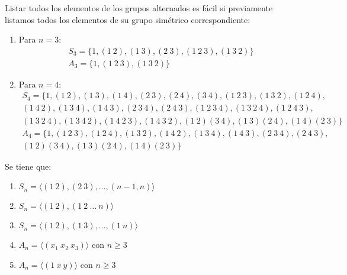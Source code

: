 \begin{ejemplo}
    Listar todos los elementos de los grupos alternados es fácil si previamente listamos todos los elementos de su grupo simétrico correspondiente:
    \begin{enumerate}
        \item Para $n=3$:
        \begin{gather*}
            S_3 = \{1, (1\ 2), (1\ 3), (2\ 3), (1\ 2\ 3), (1\ 3\ 2)\} \\
            A_3 = \{1, (1\ 2\ 3), (1\ 3\ 2)\}
        \end{gather*}
        \item Para $n=4$:
            \begin{multline*}
                S_4 = \{1, (1\ 2), (1\ 3), (1\ 4), (2\ 3), (2\ 4), (3\ 4), (1\ 2\ 3), (1\ 3\ 2), (1\ 2\ 4), \\
                    (1\ 4\ 2), (1\ 3\ 4), (1\ 4\ 3), (2\ 3\ 4), (2\ 4\ 3), (1\ 2\ 3\ 4), (1\ 3\ 2\ 4), (1\ 2\ 4\ 3), \\
                (1\ 3\ 2\ 4), (1\ 3\ 4\ 2), (1\ 4\ 2\ 3), (1\ 4\ 3\ 2), (1\ 2)(3\ 4), (1\ 3)(2\ 4), (1\ 4)(2\ 3)\}
            \end{multline*}
            \begin{multline*}
                A_4 = \{1, (1\ 2\ 3), (1\ 2\ 4), (1\ 3\ 2), (1\ 4\ 2), (1\ 3\ 4), (1\ 4\ 3), (2\ 3\ 4), (2\ 4\ 3), \\
                (1\ 2)(3\ 4), (1\ 3)(2\ 4), (1\ 4)(2\ 3)\}
            \end{multline*}
    \end{enumerate}
\end{ejemplo}

\begin{prop}
    Se tiene que:
    \begin{enumerate}[label=(\alph*)]
        \item $S_n = \langle (1\ 2),(2\ 3),\ldots,(n-1, n) \rangle $
        \item $S_n = \langle (1\ 2), (1\ 2\ \ldots\ n) \rangle $
        \item $S_n = \langle (1\ 2),(1\ 3), \ldots, (1\ n)\rangle $
        \item $A_n = \langle (x_1\ x_2\ x_3) \rangle $ con $n\geq 3$
        \item $A_n = \langle (1\ x\ y) \rangle $ con $n\geq 3$
    \end{enumerate}
\end{prop}
